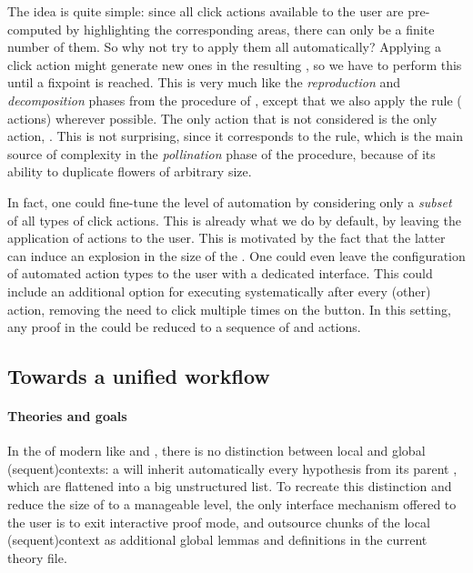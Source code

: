 \begin{scope}
The idea is quite simple: since all click actions available to the user are
pre-computed by highlighting the corresponding areas, there can only be a finite
number of them. So why not try to apply them all automatically? Applying a click
action might generate new ones in the resulting , so we have to perform this
until a fixpoint is reached. This is very much like the \emph{reproduction} and
\emph{decomposition} phases from the  procedure of
, except that we also apply the  rule
( actions) wherever possible. The only \Proof action that is not
considered is the only  action, . This is not surprising,
since it corresponds to the  rule, which is the main source of
complexity in the \emph{pollination} phase of the  procedure,
because of its ability to duplicate flowers of arbitrary size.

In fact, one could fine-tune the level of automation by considering only a
\emph{subset} of all types of click actions. This is already what we do by
default, by leaving the application of  actions to the user. This
is motivated by the fact that the latter can induce an explosion in the size of
the . One could even leave the configuration of automated action types to
the user with a dedicated interface. This could include an additional option for
executing  systematically after every (other) \Proof action,
removing the need to click multiple times on the  button. In this
setting, any proof in the  could be reduced to a sequence of
 and  actions.


\subsection{Towards a unified workflow}

\paragraph{Theories and goals}

In the  of modern  like  and
, there is no distinction between local and global
\kl(sequent){contexts}: a  will inherit automatically every
hypothesis from its parent , which are flattened into a big
unstructured list. To recreate this distinction and reduce the size of
 to a manageable level, the only interface mechanism offered to the
user is to exit interactive proof mode, and outsource chunks of the local
\kl(sequent){context} as additional global lemmas and definitions in the current
theory file.


\end{scope}
